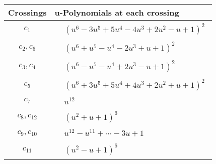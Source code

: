 \documentclass[1p]{elsarticle_modified}
\theoremstyle{definition}
\begin{document}
\begin{tabular}{m{50pt}|m{274pt}}
Crossings & \hspace{64pt}u-Polynomials at each crossing \\
\hline $$\begin{aligned}c_{1}\end{aligned}$$&$\begin{aligned}
&(u^6-3 u^5+5 u^4-4 u^3+2 u^2- u+1)^2
\end{aligned}$\\
\hline $$\begin{aligned}c_{2},c_{6}\end{aligned}$$&$\begin{aligned}
&(u^6+u^5- u^4-2 u^3+u+1)^2
\end{aligned}$\\
\hline $$\begin{aligned}c_{3},c_{4}\end{aligned}$$&$\begin{aligned}
&(u^6- u^5- u^4+2 u^3- u+1)^2
\end{aligned}$\\
\hline $$\begin{aligned}c_{5}\end{aligned}$$&$\begin{aligned}
&(u^6+3 u^5+5 u^4+4 u^3+2 u^2+u+1)^2
\end{aligned}$\\
\hline $$\begin{aligned}c_{7}\end{aligned}$$&$\begin{aligned}
&u^{12}
\end{aligned}$\\
\hline $$\begin{aligned}c_{8},c_{12}\end{aligned}$$&$\begin{aligned}
&(u^2+u+1)^6
\end{aligned}$\\
\hline $$\begin{aligned}c_{9},c_{10}\end{aligned}$$&$\begin{aligned}
&u^{12}- u^{11}+\cdots-3 u+1
\end{aligned}$\\
\hline $$\begin{aligned}c_{11}\end{aligned}$$&$\begin{aligned}
&(u^2- u+1)^6
\end{aligned}$\\
\hline
\end{tabular}\\~\\
\end{document}
